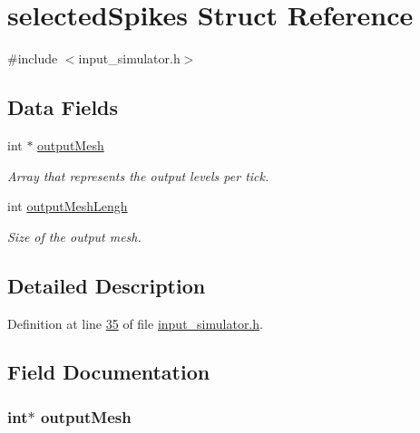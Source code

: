 \hypertarget{structselected_spikes}{}\section{selected\+Spikes Struct Reference}
\label{structselected_spikes}


{\ttfamily \#include $<$input\+\_\+simulator.\+h$>$}

\subsection*{Data Fields}
\begin{DoxyCompactItemize}
\item 
int $\ast$ \hyperlink{structselected_spikes_a666eb9ad96121cf3e4ce134e1a4c12c0}{output\+Mesh}
\begin{DoxyCompactList}\small\item\em Array that represents the output levels per tick. \end{DoxyCompactList}\item 
int \hyperlink{structselected_spikes_a97727a3be0dbd5813f860c99733048a8}{output\+Mesh\+Lengh}
\begin{DoxyCompactList}\small\item\em Size of the output mesh. \end{DoxyCompactList}\end{DoxyCompactItemize}


\subsection{Detailed Description}


Definition at line \hyperlink{input__simulator_8h_source_l00035}{35} of file \hyperlink{input__simulator_8h_source}{input\+\_\+simulator.\+h}.



\subsection{Field Documentation}
\hypertarget{structselected_spikes_a666eb9ad96121cf3e4ce134e1a4c12c0}{}
\subsubsection[{output\+Mesh}]{\setlength{\rightskip}{0pt plus 5cm}int$\ast$ output\+Mesh}\label{structselected_spikes_a666eb9ad96121cf3e4ce134e1a4c12c0}



